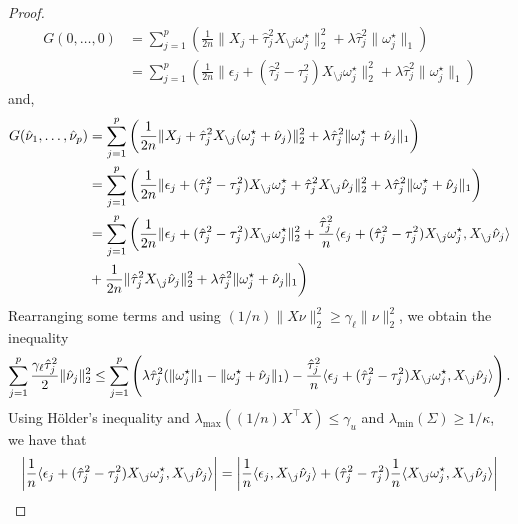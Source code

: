\documentclass{article}
\begin{document}
\begin{proof}
\begin{equation}
\begin{aligned}
        G(0, \dots, 0) &= \sum_{j=1}^{p} \left(\frac{1}{2n} \|X_j + \hat \tau_j^2 X_{\setminus j} \omega^\star_j\|_2^2 + \lambda \hat\tau_j^2 \|\omega^\star_j\|_1\right) \\
                        &= \sum_{j=1}^{p} \left(\frac{1}{2n} \|\epsilon_j + (\hat \tau_j^2 - \tau_j^2) X_{\setminus j} \omega^\star_j\|_2^2 + \lambda \hat\tau_j^2 \|\omega^\star_j\|_1\right)                 
    \end{aligned}
\end{equation}
and, 
\begin{equation*}
    \begin{aligned}
        G(\hat \nu_1, \dots, \hat \nu_p) &= \sum_{j=1}^{p} \left(\frac{1}{2n}\|X_j + \hat \tau_j^2 X_{\setminus j}(\omega^\star_j + \hat \nu_j)\|_2^2 + \lambda \hat\tau_j^2 \|\omega^\star_j + \hat \nu_j\|_1\right) \\
            &= \sum_{j=1}^{p} \left(\frac{1}{2n}\|\epsilon_j + (\hat \tau_j^2 - \tau_j^2) X_{\setminus j} \omega^\star_j + \hat \tau_j^2 X_{\setminus j}\hat \nu_j\|_2^2 + \lambda \hat\tau_j^2 \|\omega^\star_j + \hat \nu_j\|_1\right) \\
            &= \sum_{j=1}^{p} \bigg(\frac{1}{2n}\|\epsilon_j + (\hat \tau_j^2 - \tau_j^2) X_{\setminus j} \omega^\star_j\|_2^2 + \frac{\hat \tau_j^2}{n}\langle \epsilon_j + (\hat \tau_j^2 - \tau_j^2) X_{\setminus j}\omega^\star_j, X_{\setminus j}\hat \nu_j \rangle \\
            &+ \frac{1}{2n}\|\hat \tau_j^2 X_{\setminus j}\hat \nu_j\|_2^2 + \lambda \hat\tau_j^2 \|\omega^\star_j + \hat \nu_j\|_1\bigg)
    \end{aligned}
\end{equation*}
Rearranging some terms and using $(1/n)\|X \nu\|_2^2 \geq \gamma_\ell
\|\nu\|_2^2$, we obtain the inequality
\begin{equation*}
        \sum_{j=1}^{p} \frac{\gamma_\ell \hat \tau_j^2}{2} \|\hat \nu_j\|_2^2 \leq \sum_{j=1}^{p} \left(\lambda \hat\tau_j^2 (\|\omega^\star_j\|_1 - \|\omega^\star_j + \hat \nu_j\|_1) - \frac{\hat \tau_j^2}{n}\langle \epsilon_j + (\hat \tau_j^2 - \tau_j^2) X_{\setminus j}\omega^\star_j, X_{\setminus j}\hat \nu_j \rangle \right).
\end{equation*}
Using Hölder's inequality and $\lambda_\text{max}((1/n) X^\top X) \leq
\gamma_u$ and $\lambda_\text{min}(\Sigma) \geq 1/\kappa$, we have that
\[
    \begin{aligned}
        \left|\frac{1}{n}\braket{\epsilon_j + (\hat \tau_j^2 - \tau_j^2) X_{\setminus j}\omega^\star_j, X_{\setminus j}\hat \nu_j}\right| &= \left|\frac{1}{n}\braket{\epsilon_j, X_{\setminus j} \hat \nu_j} + (\hat \tau_j^2 - \tau_j^2)\frac{1}{n}\braket{X_{\setminus j}\omega^\star_j, X_{\setminus j}\hat \nu_j} \right|\\

\end{aligned}\]
\end{proof}
\end{document}
